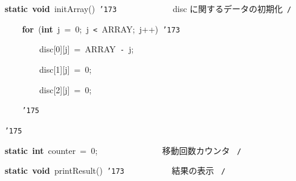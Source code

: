 \documentclass[a4paper,10pt]{article}
\def\mc{\relax}
\begin{document}
\noindent
\mbox{}\hfill

\noindent
\mbox{}{\tt\mc \ }{\tt\mc \ }{\tt\mc \ }{\tt\mc \ }\textbf{static}{\tt\mc \ }\textbf{void}{\tt\mc \ }initArray(){\tt\mc \ }{\tt\char'173}{\tt\mc \ }{\tt\mc \ }{\tt\mc \ }{\tt\mc \ }{\tt\mc \ }{\tt\mc \ }{\tt\mc \ }{\tt\mc \ }{\tt\mc \ }{\tt\mc \ }{\tt\mc \ }\rm\mc {\tt /}{\tt *}\  \ disc に関するデータの初期化\hfill \rm\mc \ {\tt *}{\tt /}
\tt\mc 

\noindent
\mbox{}{\tt\mc \ }{\tt\mc \ }{\tt\mc \ }{\tt\mc \ }{\tt\mc \ }{\tt\mc \ }{\tt\mc \ }{\tt\mc \ }\textbf{for}{\tt\mc \ }(\textbf{int}{\tt\mc \ }j{\tt\mc \ }={\tt\mc \ }0;{\tt\mc \ }j{\tt\mc \ }{\tt <}{\tt\mc \ }ARRAY;{\tt\mc \ }j++){\tt\mc \ }{\tt\char'173}

\noindent
\mbox{}{\tt\mc \ }{\tt\mc \ }{\tt\mc \ }{\tt\mc \ }{\tt\mc \ }{\tt\mc \ }{\tt\mc \ }{\tt\mc \ }{\tt\mc \ }{\tt\mc \ }{\tt\mc \ }{\tt\mc \ }disc[0][j]{\tt\mc \ }={\tt\mc \ }ARRAY{\tt\mc \ }{\tt -}{\tt\mc \ }j;

\noindent
\mbox{}{\tt\mc \ }{\tt\mc \ }{\tt\mc \ }{\tt\mc \ }{\tt\mc \ }{\tt\mc \ }{\tt\mc \ }{\tt\mc \ }{\tt\mc \ }{\tt\mc \ }{\tt\mc \ }{\tt\mc \ }disc[1][j]{\tt\mc \ }={\tt\mc \ }0;

\noindent
\mbox{}{\tt\mc \ }{\tt\mc \ }{\tt\mc \ }{\tt\mc \ }{\tt\mc \ }{\tt\mc \ }{\tt\mc \ }{\tt\mc \ }{\tt\mc \ }{\tt\mc \ }{\tt\mc \ }{\tt\mc \ }disc[2][j]{\tt\mc \ }={\tt\mc \ }0;

\noindent
\mbox{}{\tt\mc \ }{\tt\mc \ }{\tt\mc \ }{\tt\mc \ }{\tt\mc \ }{\tt\mc \ }{\tt\mc \ }{\tt\mc \ }{\tt\char'175}

\noindent
\mbox{}{\tt\mc \ }{\tt\mc \ }{\tt\mc \ }{\tt\mc \ }{\tt\char'175}

\noindent
\mbox{}\hfill

\noindent
\mbox{}{\tt\mc \ }{\tt\mc \ }{\tt\mc \ }{\tt\mc \ }\textbf{static}{\tt\mc \ }\textbf{int}{\tt\mc \ }counter{\tt\mc \ }={\tt\mc \ }0;{\tt\mc \ }{\tt\mc \ }{\tt\mc \ }{\tt\mc \ }{\tt\mc \ }{\tt\mc \ }{\tt\mc \ }{\tt\mc \ }{\tt\mc \ }{\tt\mc \ }{\tt\mc \ }{\tt\mc \ }{\tt\mc \ }\rm\mc {\tt /}{\tt *}\  \ 移動回数カウンタ \hfill \rm\mc \ {\tt *}{\tt /}
\tt\mc 

\noindent
\mbox{}\hfill

\noindent
\mbox{}{\tt\mc \ }{\tt\mc \ }{\tt\mc \ }{\tt\mc \ }\textbf{static}{\tt\mc \ }\textbf{void}{\tt\mc \ }printResult(){\tt\mc \ }{\tt\char'173}{\tt\mc \ }{\tt\mc \ }{\tt\mc \ }{\tt\mc \ }{\tt\mc \ }{\tt\mc \ }{\tt\mc \ }{\tt\mc \ }{\tt\mc \ }\rm\mc {\tt /}{\tt *}\  \ 結果の表示 \hfill \rm\mc \ {\tt *}{\tt /}
\tt\mc 
\end{document}
